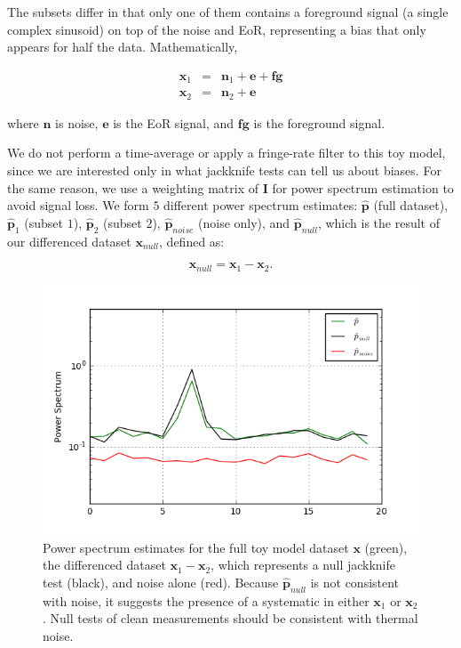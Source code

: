 \documentclass[preprint2,numberedappendix,tighten]{aastex6}  %
\begin{document}
The subsets differ in that only one of them contains a foreground signal (a single complex sinusoid) on top of the noise and EoR, representing a bias that only appears for half the data. Mathematically, 

\begin{eqnarray}
\textbf{x}_{1} &=& \textbf{n}_{1} + \textbf{e} + \textbf{fg} \\
\textbf{x}_{2} &=& \textbf{n}_{2} + \textbf{e}
\end{eqnarray}

\noindent where $\textbf{n}$ is noise, $\textbf{e}$ is the EoR signal, and $\textbf{fg}$ is the foreground signal. 

We do not perform a time-average or apply a fringe-rate filter to this toy model, since we are interested only in what jackknife tests can tell us about biases. For the same reason, we use a weighting matrix of $\textbf{I}$ for power spectrum estimation to avoid signal loss. We form $5$ different power spectrum estimates: $\hat{\textbf{p}}$ (full dataset), $\hat{\textbf{p}}_{1}$ (subset $1$), $\hat{\textbf{p}}_{2}$ (subset $2$), $\hat{\textbf{p}}_{noise}$ (noise only), and $\hat{\textbf{p}}_{null}$, which is the result of our differenced dataset $\textbf{x}_{null}$, defined as:

\begin{equation}
\textbf{x}_{null} = \textbf{x}_{1} - \textbf{x}_{2}. 
\end{equation}

\begin{figure}
	\centering
	\includegraphics[trim={0.3cm 0.3cm 0.3cm 0.3cm},width=\columnwidth]{plots/toy_bias1.png}
	\caption{Power spectrum estimates for the full toy model dataset $\textbf{x}$ (green), the differenced dataset $\textbf{x}_{1}-\textbf{x}_{2}$, which represents a null jackknife test (black), and noise alone (red). Because $\hat{\textbf{p}}_{null}$ is not consistent with noise, it suggests the presence of a systematic in either $\textbf{x}_{1}$ or $\textbf{x}_{2}$. Null tests of clean measurements should be consistent with thermal noise.}
	\label{fig:toy_bias1}
\end{figure}
\end{document}
